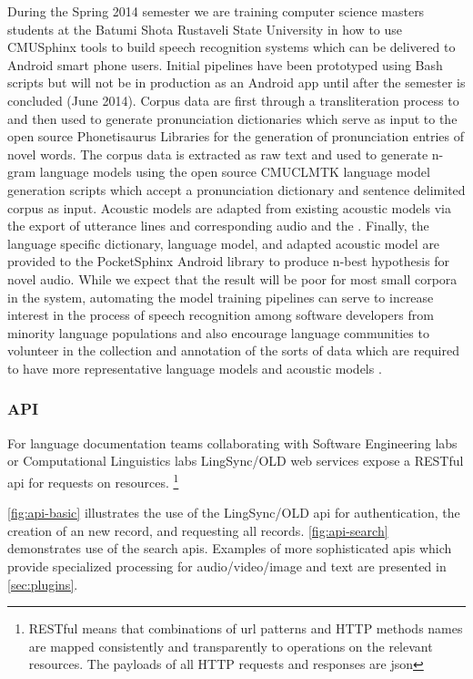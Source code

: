 \documentclass[11pt]{article}
\begin{document}
During the Spring 2014 semester we are training computer science masters
students at the Batumi Shota Rustaveli  State University in how to use
CMUSphinx tools to build speech recognition systems which can be delivered to
Android smart phone users. Initial pipelines have been prototyped using Bash
scripts but will not be in production as an Android app until after the
semester is concluded (June 2014). Corpus data are first through a
transliteration process to and then used to generate pronunciation dictionaries
which serve as input  to the open source Phonetisaurus Libraries
\cite{Novak:2012} for the generation of pronunciation entries of novel words.
The corpus data is extracted as raw text and used to generate n-gram language
models using the open source CMUCLMTK \cite{Clarkson:1997} language model
generation scripts which accept a pronunciation dictionary and sentence
delimited corpus as input. Acoustic models are adapted from existing acoustic
models via the export of utterance lines and corresponding audio and the 
\cite{Elmahdy:2010}. Finally, the language specific dictionary, language model,
and adapted acoustic model are provided to the PocketSphinx Android library to
produce n-best hypothesis for novel audio. While we expect that the result will
be poor for most small corpora in the system, automating the model training
pipelines can serve to increase interest in the process of speech recognition
among software developers from minority language populations  and also
encourage language communities to volunteer in the collection and annotation of
the sorts of data which are required to have more representative language
models and acoustic models \cite{Sarfraz:2010}.


\subsubsection{API}

For language documentation teams collaborating with Software Engineering labs
or Computational Linguistics labs LingSync/OLD web services expose a RESTful
\gls{api} for requests on resources.%
\footnote{RESTful means that combinations of \gls{url} patterns and HTTP methods
    names are mapped consistently and transparently to operations on the
    relevant resources. The payloads of all HTTP requests and responses are
\gls{json}}

\autoref{fig:api-basic} illustrates the use of the LingSync/OLD \gls{api} for
authentication, the creation of an new record, and requesting all records.
\autoref{fig:api-search} demonstrates use of the search \glspl{api}. Examples of
more sophisticated  \glspl{api} which provide specialized processing for
audio/video/image and text  are presented in \autoref{sec:plugins}.
\end{document}

